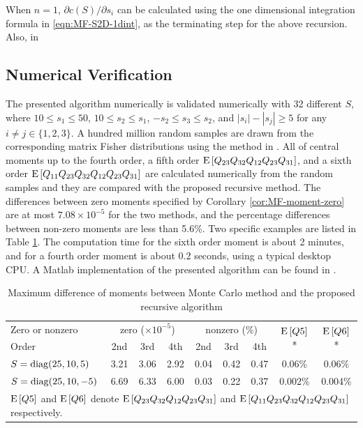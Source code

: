 When $n=1$, $\partial c(S)/\partial s_i$ can be calculated using the one dimensional integration formula in \eqref{eqn:MF-S2D-1dint}, as the terminating step for the above recursion.
Also, in 

\subsection{Numerical Verification}

The presented algorithm numerically is validated numerically with 32 different $S$, where $10 \leq s_1 \leq 50$, $10 \leq s_2 \leq s_1$, $-s_2 \leq s_3 \leq s_2$, and $|s_i|-|s_j| \geq 5$ for any $i\neq j\in\{1,2,3\}$.
A hundred million random samples are drawn from the corresponding matrix Fisher distributions using the method in \cite{kent2013new}.
All of central moments up to the fourth order, a fifth order $\mathrm{E}\left[ Q_{23}Q_{32}Q_{12}Q_{23}Q_{31} \right]$, and a sixth order $\mathrm{E}\left[ Q_{11}Q_{23}Q_{32}Q_{12}Q_{23}Q_{31} \right]$ are calculated numerically from the random samples and they are compared with the proposed recursive method.
The differences between zero moments specified by Corollary \ref{cor:MF-moment-zero} are at most $7.08\times 10^{-5}$ for the two methods, and the percentage differences between non-zero moments are less than 5.6\%.
Two specific examples are listed in Table \ref{tab:MF-moment-result}.
The computation time for the sixth order moment is about 2 minutes, and for a fourth order moment is about 0.2 seconds, using a typical desktop CPU.
A Matlab implementation of the presented algorithm can be found in \cite{MFMomentCode}.

\begin{table}
	\centering
	\caption{Maximum difference of moments between Monte Carlo method and the proposed recursive algorithm \label{tab:MF-moment-result}}
	\begin{tabular}{l|ccc|ccc|c|c}
		\hline
		Zero or nonzero & \multicolumn{3}{c|}{zero ($\times 10^{-5}$)} & \multicolumn{3}{c|}{nonzero (\%)} & \multirow{2}{*}{$\mathrm{E}\left[ Q5 \right]$*} & \multirow{2}{*}{$\mathrm{E}\left[ Q6 \right]$*} \\ 
		Order & 2nd & 3rd & 4th & 2nd & 3rd & 4th & \\ \hline
		$S = \mathrm{diag}(25,10,5)$ & 3.21 & 3.06 & 2.92 & 0.04 & 0.42 & 0.47 & 0.06\% & 0.06\% \\
		$S = \mathrm{diag}(25,10,-5)$ & 6.69 & 6.33 & 6.00 & 0.03 & 0.22 & 0.37 & 0.002\% & 0.004\% \\ \hline
		\multicolumn{9}{l}{\footnotesize * $\mathrm{E}\left[ Q5 \right]$ and $\mathrm{E}\left[ Q6 \right]$ denote $\mathrm{E}\left[ Q_{23}Q_{32}Q_{12}Q_{23}Q_{31} \right]$ and $\mathrm{E}\left[ Q_{11}Q_{23}Q_{32}Q_{12}Q_{23}Q_{31} \right]$ respectively.}
	\end{tabular}
\end{table}

